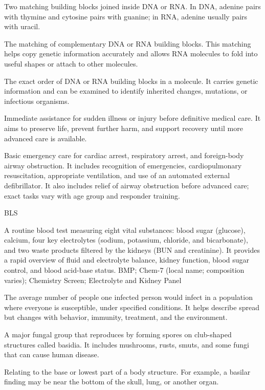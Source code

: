  Two matching building blocks joined inside DNA or RNA. In DNA, adenine pairs with thymine and cytosine pairs with guanine; in RNA, adenine usually pairs with uracil.

 The matching of complementary DNA or RNA building blocks. This matching helps copy genetic information accurately and allows RNA molecules to fold into useful shapes or attach to other molecules.

 The exact order of DNA or RNA building blocks in a molecule. It carries genetic information and can be examined to identify inherited changes, mutations, or infectious organisms.

 Immediate assistance for sudden illness or injury
before definitive medical care. It aims to preserve life, prevent further
harm, and support recovery until more advanced care is available.

 Basic emergency care for cardiac arrest, respiratory arrest, and foreign-body airway obstruction.
It includes recognition of emergencies, cardiopulmonary resuscitation, appropriate ventilation, and use of an automated
external defibrillator. It also includes relief of airway obstruction before advanced care; exact tasks vary with age group
and responder training.

\synonyms
BLS

 A routine blood test measuring eight vital substances: blood sugar (glucose), calcium, four key electrolytes (sodium, potassium, chloride, and bicarbonate), and two waste products filtered by the kidneys (BUN and creatinine). It provides a rapid overview of fluid and electrolyte balance, kidney function, blood sugar control, and blood acid-base status.
\synonyms
BMP; Chem-7 (local name; composition varies); Chemistry Screen; Electrolyte and Kidney Panel

 The average number of people one infected person would infect in a population where everyone is susceptible, under specified conditions. It helps describe spread but changes with behavior, immunity, treatment, and the environment.

 A major fungal group that reproduces by forming spores on club-shaped structures called basidia. It includes mushrooms, rusts, smuts, and some fungi that can cause human disease.

 Relating to the base or lowest part of a body structure. For example, a basilar finding may be near the bottom of the skull, lung, or another organ.

